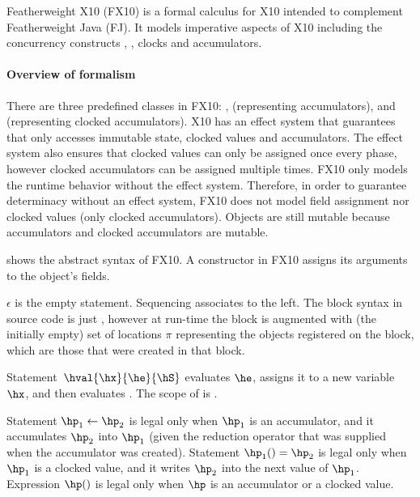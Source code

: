 Featherweight X10 (FX10) is a formal calculus for X10 intended to  complement Featherweight Java
(FJ).  It models imperative aspects of X10 including the concurrency
constructs \hfinish{}, \hasync{}, clocks and accumulators.


\paragraph{Overview of formalism}
There are three predefined classes in FX10:
    ,
     (representing accumulators),
    and  (representing clocked accumulators).
X10 has an effect system that guarantees that
    \hasync{} only accesses immutable state, clocked values and accumulators.
The effect system also ensures that clocked values can only be assigned once every phase,
    however clocked accumulators can be assigned multiple times.
FX10 only models the runtime behavior without the effect system.
Therefore, in order to guarantee determinacy without an effect system,
    FX10 does not model field assignment nor clocked values (only clocked accumulators).
Objects are still mutable because accumulators and clocked accumulators
    are mutable.



 shows the abstract syntax of FX10.
A constructor in FX10 assigns its arguments to the object's fields.

$\epsilon$ is the empty statement. Sequencing associates to the left.
The block syntax in source code is just \code{\{\hS\}},
however at run-time the block is augmented with (the initially empty) set of locations
$\pi$ representing the objects registered on the block,
     which are those that were created in that block.

Statement~$\hval{\hx}{\he}{\hS}$ evaluates $\he$, assigns it to a
new variable $\hx$, and then evaluates \hS. The scope of \hx{} is \hS.

Statement $\hp_1 \leftarrow \hp_2$ is legal only when $\hp_1$ is an accumulator,
    and it accumulates $\hp_2$ into $\hp_1$ (given the reduction operator that was supplied when the accumulator was created).
Statement $\hp_1() = \hp_2$ is legal only when $\hp_1$ is a clocked value,
    and it writes $\hp_2$ into the next value of $\hp_1$.
Expression $\hp()$ is legal only when $\hp$ is an accumulator or a clocked value.



